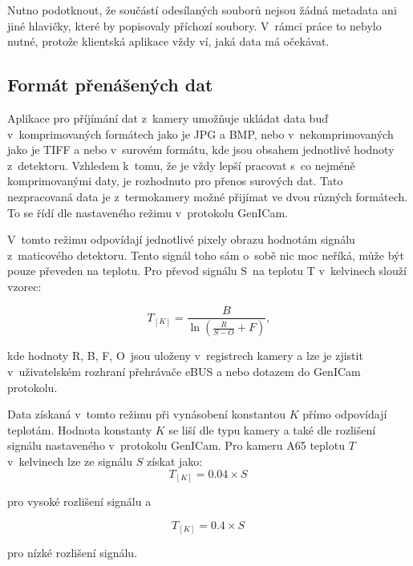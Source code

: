     Nutno podotknout, že součástí odesílaných souborů nejsou žádná metadata ani jiné hlavičky, které by popisovaly příchozí soubory. V~rámci práce to nebylo nutné, protože klientská aplikace vždy ví, jaká data má očekávat. 

	\subsection{Formát přenášených dat} \label{transmitted_data_format}    
    Aplikace pro příjímání dat z~kamery umožňuje ukládat data buď v~komprimovaných formátech jako je JPG a BMP, nebo v~nekomprimovaných jako je TIFF a nebo v~surovém formátu, kde jsou obsahem jednotlivé hodnoty z~detektoru. Vzhledem k~tomu, že je vždy lepší pracovat s~co nejméně komprimovanými daty, je rozhodnuto pro přenos surových dat. Tato nezpracovaná data je z~termokamery možné přijímat ve dvou různých formátech. To se řídí dle nastaveného režimu v~protokolu GenICam.
       
    \begin{description}[align=left]\label{description:transfer_data_modes}
      \item [Signal linear mode] V~tomto režimu odpovídají jednotlivé pixely obrazu hodnotám signálu z~maticového detektoru. Tento signál toho sám o~sobě nic moc neříká, může být pouze převeden na teplotu. Pro převod signálu S~na teplotu T v~kelvinech slouží vzorec:

      \begin{equation}
      	T_{[K]}=\frac{B}{\ln{\left(\frac{R}{S - O} + F\right)}},
      \end{equation}

      kde hodnoty R, B, F, O~jsou uloženy v~registrech kamery a lze je zjistit v~uživatelském rozhraní přehrávače eBUS a nebo dotazem do GenICam protokolu.

      \item [Temperature linear mode]\label{item:temperature_linear} Data získaná v~tomto režimu při vynásobení konstantou $K$ přímo odpovídají teplotám. Hodnota konstanty $K$ se liší dle typu kamery a také dle rozlišení signálu nastaveného v~protokolu GenICam. Pro kameru A65 teplotu $T$ v~kelvinech lze ze signálu $S$ získat jako:
      \begin{equation}
		T_{[K]}=0.04 \times
S~\end{equation} 
      
      pro vysoké rozlišení signálu a 
      
      \begin{equation}
		T_{[K]}=0.4 \times
S~\end{equation}
       
       pro nízké rozlišení signálu.
    \end{description}
    

